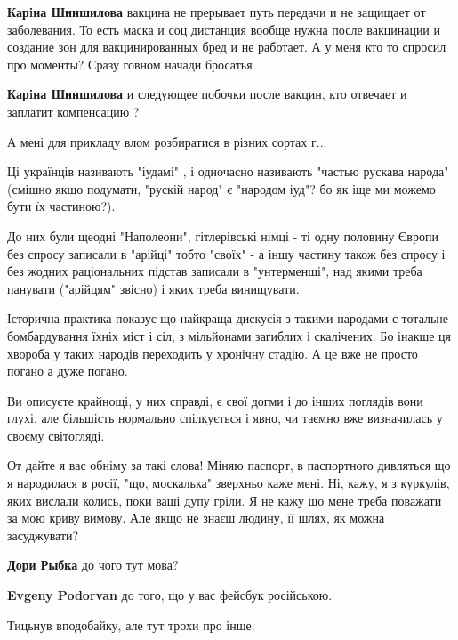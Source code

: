 \begin{itemize}
\begin{itemize}
\textbf{Карiна Шиншилова} вакцина не прерывает путь передачи и не защищает от заболевания. То есть маска и соц дистанция вообще нужна после вакцинации и создание зон для вакцинированных бред и не работает. А у меня кто то спросил про моменты? Сразу говном начади бросатья

\textbf{Карiна Шиншилова} и следующее побочки после вакцин, кто отвечает и заплатит компенсацию ?
\end{itemize} %


А мені для прикладу влом розбиратися в різних сортах г...

Ці українців називають "іудамі" , і одночасно називають "частью рускава народа"
(смішно якщо подумати, "рускій народ" є "народом іуд"? бо як іще ми можемо бути
їх частиною?).

До них були щеодні "Наполеони", гітлерівські німці - ті одну половину Європи
без спросу записали в "арійці" тобто "своїх" - а іншу частину також без спросу
і без жодних раціональних підстав записали в "унтерменші", над якими треба
панувати ("арійцям" звісно) і яких треба винищувати.

Історична практика показує що найкраща дискусія з такими народами є тотальне
бомбардування їхніх міст і сіл, з мільйонами загиблих і скалічених. Бо інакше
ця хвороба у таких народів переходить у хронічну стадію. А це вже не просто
погано а дуже погано.



Ви описуєте крайнощі, у них справді, є свої догми і до інших поглядів вони
глухі, але більшість нормально спілкується і явно, чи таємно вже визначилась у
своєму світогляді.


\obeycr
От дайте я вас обніму за такі слова!
Міняю паспорт, в паспортного дивляться що я народилася в росії, "що, москалька" зверхньо каже мені.
Ні, кажу, я з куркулів, яких вислали колись, поки ваші дупу гріли.
Я не кажу що мене треба поважати за мою криву вимову. Але якщо не знаєш людину, її шлях, як можна засуджувати?
\restorecr

\begin{itemize} %
\textbf{Дори Рыбка} до чого тут мова?

\textbf{Evgeny Podorvan} до того, що у вас фейсбук російською.

Тицьнув вподобайку, але тут трохи про інше.


\end{itemize}
\end{itemize}
